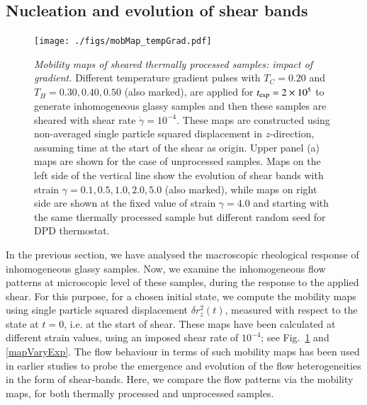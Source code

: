 \subsection{Nucleation and evolution of shear bands}

\begin{figure}[hbt!]
\centering
\texttt{[image: ./figs/mobMap\_tempGrad.pdf]}
\caption[{\em Mobility maps of sheared thermally processed samples: impact of gradient}]{{\em Mobility maps of sheared thermally processed samples: impact of gradient.} Different temperature gradient pulses with $T_C = 0.20$ and $T_H = 0.30, 0.40, 0.50$ (also marked), are applied for $t_{\rm exp} = 2\times10^5$ to generate inhomogeneous glassy samples and then these samples are sheared with shear rate $\dot{\gamma} = 10^{-4}$. These maps are constructed using non-averaged single particle squared displacement in $z$-direction, assuming time at the start of the shear as origin. Upper panel (a) maps are shown for the case of unprocessed samples. Maps on the left side of the vertical line show the evolution of shear bands with strain $\gamma = 0.1, 0.5, 1.0, 2.0, 5.0$ (also marked), while maps on right side are shown at the fixed value of strain $\gamma = 4.0$ and starting with the same thermally processed sample but different random seed for DPD thermostat.}
\label{mapVaryGrad}
\end{figure}


In the previous section, we have analysed the macroscopic rheological response of inhomogeneous glassy samples. Now, we examine the inhomogeneous flow patterns at microscopic level of these samples, during the response to the applied shear. For this purpose, for a chosen initial state, we compute the mobility  maps using  single particle squared displacement $\delta r^2_z(t)$, measured with respect to the state at $t=0$, i.e. at the start of shear. These maps have been calculated at different strain values, using an imposed shear rate of $10^{-4}$; see Fig.~\ref{mapVaryGrad} and \ref{mapVaryExp}. The flow behaviour in terms of such mobility maps has been used in earlier studies \cite{golkia2020} to probe the emergence and evolution of the flow heterogeneities in the form of shear-bands. Here, we compare the flow patterns via the mobility maps, for both thermally processed and unprocessed samples.

